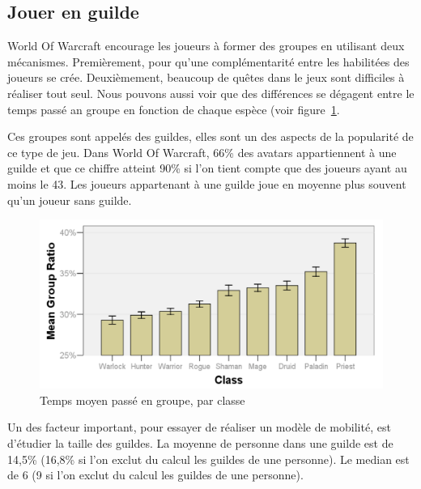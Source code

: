 \documentclass[10pt,twocolumn]{article}
\begin{document}
\subsection{Jouer en guilde}
World Of Warcraft encourage les joueurs à former des groupes en utilisant deux mécanismes. Premièrement, pour qu'une complémentarité entre les habilitées des joueurs se crée. Deuxièmement, beaucoup de quêtes dans le jeux sont difficiles à réaliser tout seul. Nous pouvons aussi voir que des différences se dégagent entre le temps passé an groupe en fonction de chaque espèce (voir figure~\ref{tabltimegroup}.
\par Ces groupes sont appelés des guildes, elles sont un des aspects de la popularité de ce type de jeu. Dans World Of Warcraft, 66\% des avatars appartiennent à une guilde et que ce chiffre atteint 90\% si l'on tient compte que des joueurs ayant au moins le 43. Les joueurs appartenant à une guilde joue en moyenne plus souvent qu'un joueur sans guilde. 
	\begin{figure}[!h]
        \centering
        \includegraphics[scale=0.95]{./images/tabltimegroup.png}
        \caption{Temps moyen passé en groupe, par classe}
        \label{tabltimegroup}
        \end{figure}
\par Un des facteur important, pour essayer de réaliser un modèle de mobilité, est d'étudier la taille des guildes. La moyenne de personne dans une guilde est de 14,5\% (16,8\% si l'on exclut du calcul les guildes de une personne). Le median est de 6 (9 si l'on exclut du calcul les guildes de une personne). 
\end{document}
